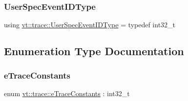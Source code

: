 \mbox{\label{namespacevt_1_1trace_a70c43e0e1596eea236912d4197d3120a}} 
\subsubsection{\texorpdfstring{User\+Spec\+Event\+I\+D\+Type}{UserSpecEventIDType}}
{\footnotesize\ttfamily using \hyperlink{namespacevt_1_1trace_a70c43e0e1596eea236912d4197d3120a}{vt\+::trace\+::\+User\+Spec\+Event\+I\+D\+Type} = typedef int32\+\_\+t}



\subsection{Enumeration Type Documentation}
\mbox{\label{namespacevt_1_1trace_acf454dfbd581b0ebae895f90b5927a1d}} 
\subsubsection{\texorpdfstring{e\+Trace\+Constants}{eTraceConstants}}
{\footnotesize\ttfamily enum \hyperlink{namespacevt_1_1trace_acf454dfbd581b0ebae895f90b5927a1d}{vt\+::trace\+::e\+Trace\+Constants} \+: int32\+\_\+t\hspace{0.3cm}{\ttfamily [strong]}}


